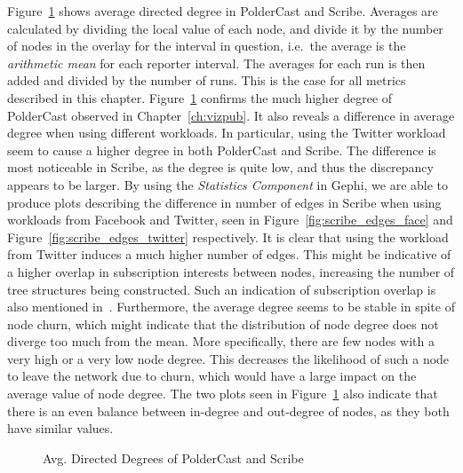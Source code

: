 Figure~\ref{fig:eval_directeddegree} shows average directed degree in
PolderCast and Scribe. Averages are calculated by dividing the local
value of each node, and divide it by the number of nodes in the overlay
for the interval in question, i.e.\ the average is the \emph{arithmetic
    mean} for each reporter interval. The averages for each run is then
added and divided by the number of runs. This is the case for all
metrics described in this chapter. Figure~\ref{fig:eval_directeddegree}
confirms the much higher degree of PolderCast observed in
Chapter~\ref{ch:vizpub}. It also reveals a difference in average degree
when using different workloads. In particular, using the Twitter
workload seem to cause a higher degree in both PolderCast and Scribe.
The difference is most noticeable in Scribe, as the degree is quite low,
and thus the discrepancy appears to be larger.  By using the
\emph{Statistics Component} in Gephi, we are able to produce plots
describing the difference in number of edges in Scribe when using
workloads from Facebook and Twitter, seen in
Figure~\ref{fig:scribe_edges_face} and
Figure~\ref{fig:scribe_edges_twitter} respectively. It is clear that
using the workload from Twitter induces a much higher number of edges.
This might be indicative of a higher overlap in subscription interests
between nodes, increasing the number of tree structures being
constructed. Such an indication of subscription overlap is also
mentioned in~\cite{Setty:2012}. Furthermore, the average degree seems to
be stable in spite of node churn, which might indicate that the
distribution of node degree does not diverge too much from the mean.
More specifically, there are few nodes with a very high or a very low
node degree. This decreases the likelihood of such a node to leave the
network due to churn, which would have a large impact on the average
value of node degree. The two plots seen in
Figure~\ref{fig:eval_directeddegree} also indicate that there is an even
balance between in-degree and out-degree of nodes, as they both have
similar values.

\begin{figure}[H]
    \centering
        
        \label{fig:eval_indegree}
        
        \label{fig:eval_outdegree}
    \caption{Avg. Directed Degrees of PolderCast and Scribe}
    \label{fig:eval_directeddegree}
\end{figure}



